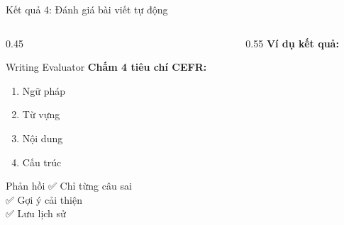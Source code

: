 \documentclass[notheorems,hyperref={bookmarks=true}]{beamer}
\begin{document}

\begin{frame}{Kết quả 4: Đánh giá bài viết tự động}
\begin{columns}
    \begin{column}{0.45\textwidth}
        \begin{exampleblock}{Writing Evaluator}
            \textbf{Chấm 4 tiêu chí CEFR:}
            \begin{enumerate}
                \item Ngữ pháp
                \item Từ vựng
                \item Nội dung
                \item Cấu trúc
            \end{enumerate}
        \end{exampleblock}
        
        \vspace{0.3cm}
        
        \begin{alertblock}{Phản hồi}
            ✅ Chỉ từng câu sai\\
            ✅ Gợi ý cải thiện\\
            ✅ Lưu lịch sử
        \end{alertblock}
    \end{column}
    \begin{column}{0.55\textwidth}
        \centering
        \textbf{Ví dụ kết quả:}\\[0.2cm]
    \end{column}
\end{columns}
\end{frame}
\end{document}
